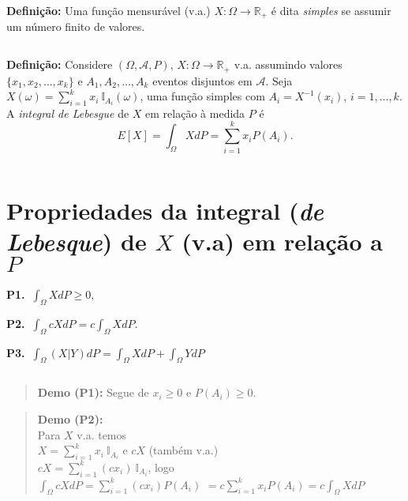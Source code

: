 \documentclass[
]{book}
\begin{document}
\textbf{Definição:} Uma função mensurável (v.a.) \(X: \Omega \longrightarrow \mathbb{R}_+\) é dita \emph{simples} se assumir um número finito de valores.

\(~\)

\textbf{Definição:} Considere \((\Omega, \mathcal{A}, P)\), \(X:\Omega\longrightarrow \mathbb{R}_+\) v.a. assumindo valores \(\{x_1,x_2,\ldots,x_k\}\) e \(A_1,A_2,\ldots,A_k\) eventos disjuntos em \(\mathcal{A}\). Seja \(\displaystyle X(\omega) = \sum_{i=1}^{k} x_i ~\mathbb{I}_{A_i}(\omega)\), uma função simples com \(A_i = X^{-1}(x_i)\), \(i=1,\ldots,k\). A \emph{integral de Lebesgue} de \(X\) em relação à medida \(P\) é
\[E[X] = \int_\Omega X dP = \sum_{i=1}^{k} x_i P(A_i).\]

\(~\)

\hypertarget{propriedades-da-integral-de-lebesque-de-x-v.a-em-relauxe7uxe3o-a-p}{%
\section{\texorpdfstring{Propriedades da integral (\emph{de Lebesque}) de \(X\) (v.a) em relação a \(P\)}{Propriedades da integral (de Lebesque) de X (v.a) em relação a P}}\label{propriedades-da-integral-de-lebesque-de-x-v.a-em-relauxe7uxe3o-a-p}}

\textbf{P1.} \(~\int_\Omega X dP \geq 0,\)

\textbf{P2.} \(~\int_\Omega cX dP = c\int_\Omega X dP.\)

\textbf{P3.} \(~\int_\Omega (X|Y) dP = \int_\Omega X dP + \int_\Omega Y dP\)

\(~\)

\begin{quote}
\textbf{Demo (P1):} Segue de \(x_i \geq 0\) e \(P(A_i) \geq 0\).
\end{quote}

\begin{quote}
\textbf{Demo (P2):}\\
Para \(X\) v.a. temos\\
\(X = \sum_{i=1}^kx_i~\mathbb{I}_{A_i}\) e \(cX\) (também v.a.)\\
\(cX = \sum_{i=1}^k(cx_i)~\mathbb{I}_{A_i}\), logo\\
\(\int_\Omega cX dP = \sum_{i=1}^k(cx_i) P(A_i)\) \(= c\sum_{i=1}^kx_i P(A_i) = c\int_\Omega X dP\)
\end{quote}
\end{document}
